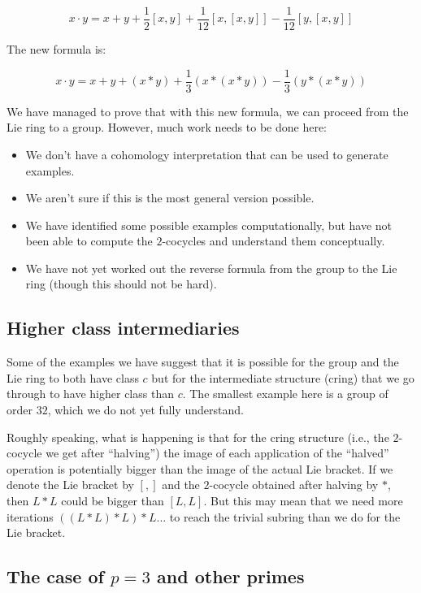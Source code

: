 \documentclass[10pt]{amsart}
\begin{document}
$$x \cdot y = x + y + \frac{1}{2}[x,y] + \frac{1}{12}[x,[x,y]] - \frac{1}{12}[y,[x,y]]$$

The new formula is:

$$x \cdot y = x + y + (x * y) + \frac{1}{3}(x * (x * y)) - \frac{1}{3}(y * (x * y))$$

We have managed to prove that with this new formula, we can proceed
from the Lie ring to a group. However, much work needs to be done here:

\begin{itemize}
\item We don't have a cohomology interpretation that can be used to
  generate examples.
\item We aren't sure if this is the most general version possible.
\item We have identified some possible examples computationally, but
  have not been able to compute the $2$-cocycles and understand them
  conceptually.
\item We have not yet worked out the reverse formula from the group to
  the Lie ring (though this should not be hard).
\end{itemize}

\subsection*{Higher class intermediaries}

Some of the examples we have suggest that it is possible for the group
and the Lie ring to both have class $c$ but for the intermediate
structure (cring) that we go through to have higher class than
$c$. The smallest example here is a group of order $32$, which we do
not yet fully understand.

Roughly speaking, what is happening is that for the cring structure
(i.e., the $2$-cocycle we get after ``halving'') the image of each
application of the ``halved'' operation is potentially bigger than the
image of the actual Lie bracket. If we denote the Lie bracket by $[,]$
and the $2$-cocycle obtained after halving by $*$, then $L * L$ could
be bigger than $[L,L]$. But this may mean that we need more iterations
$((L * L) * L) * L \dots$ to reach the trivial subring than we do for
the Lie bracket.

\subsection*{The case of $p = 3$ and other primes}
\end{document}
